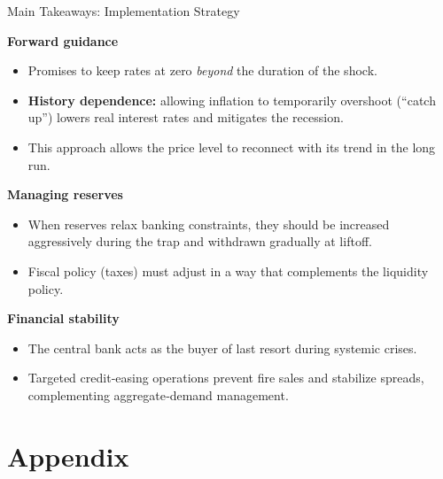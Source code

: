 \documentclass[11pt,aspectratio=169]{beamer}
\begin{document}
\begin{frame}{Main Takeaways: Implementation Strategy}
\small

\textbf{Forward guidance}
\begin{itemize}
    \item Promises to keep rates at zero \emph{beyond} the duration of the shock.
    \item \textbf{History dependence:} allowing inflation to temporarily overshoot (“catch up”) lowers real interest rates and mitigates the recession.
    \item This approach allows the price level to reconnect with its trend in the long run.
\end{itemize}

\vspace{0.2cm}

\textbf{Managing reserves}
\begin{itemize}
    \item When reserves relax banking constraints, they should be increased aggressively during the trap and withdrawn gradually at liftoff.
    \item Fiscal policy (taxes) must adjust in a way that complements the liquidity policy.
\end{itemize}

\vspace{0.2cm}

\textbf{Financial stability}
\begin{itemize}
    \item The central bank acts as the buyer of last resort during systemic crises.
    \item Targeted credit‑easing operations prevent fire sales and stabilize spreads, complementing aggregate‑demand management.
\end{itemize}

\end{frame}

\appendix
\section{Appendix}
\end{document}

